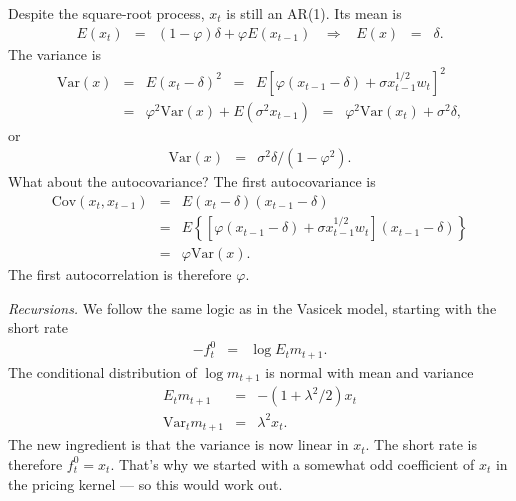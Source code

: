 \documentclass[11pt]{article}
\begin{document}
Despite the square-root process, $x_t$ is still an AR(1).
Its mean is
\begin{eqnarray*}
    E(x_t) &=& (1-\varphi) \delta + \varphi E(x_{t-1})
            \;\;\;\Rightarrow\;\;\; E(x) \;\;=\;\; \delta .
\end{eqnarray*}
The variance is
\begin{eqnarray*}
    \mbox{Var}(x) &=& E (x_t - \delta)^2
                \;\;=\;\; E \left[ \varphi (x_{t-1} - \delta) + \sigma x_{t-1}^{1/2} w_t \right]^2 \\
                &=& \varphi^2 \mbox{Var}(x) + E (\sigma^2 x_{t-1})
                \;\;=\;\;  \varphi^2 \mbox{Var}(x_{t}) + \sigma^2 \delta ,
\end{eqnarray*}
or
\begin{eqnarray*}
    \mbox{Var}(x) &=&   \sigma^2 \delta / (1-\varphi^2) .
\end{eqnarray*}
What about the autocovariance?
The first autocovariance is
\begin{eqnarray*}
    \mbox{Cov}(x_t,x_{t-1}) &=& E (x_t - \delta)(x_{t-1} - \delta)  \\
                &=& E  \left\{ [ \varphi (x_{t-1} - \delta) + \sigma x_{t-1}^{1/2} w_t ] (x_{t-1} - \delta) \right\} \\
                &=& \varphi \mbox{Var}(x) .
\end{eqnarray*}
The first autocorrelation is therefore $\varphi$.





{\it Recursions.\/}
We follow the same logic as in the Vasicek model,
starting with the short rate
\begin{eqnarray*}
    - f^0_t &=&   \log E_t m_{t+1} .
\end{eqnarray*}
The conditional distribution of $\log m_{t+1}$ is
normal with mean and variance
\begin{eqnarray*}
    E_t m_{t+1} &=& - (1+\lambda^2/2) x_t \\
    \mbox{Var}_t m_{t+1} &=& \lambda^2 x_t .
\end{eqnarray*}
The new ingredient is that the variance is now linear in $x_t$.
The short rate is therefore
$ f^0_t = x_t $.
That's why we started with a somewhat odd coefficient of $x_t$
in the pricing kernel --- so this would work out.
\end{document}
